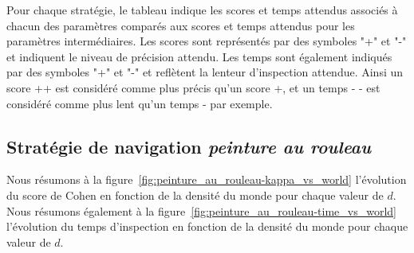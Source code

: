 \documentclass[francais,RandD]{rapportPFE}
\begin{document}
		Pour chaque stratégie, le tableau indique les scores et temps attendus associés à chacun des paramètres comparés aux scores et temps attendus pour les paramètres intermédiaires.
		Les scores sont représentés par des symboles "+" et "-" et indiquent le niveau de précision attendu.
		Les temps sont également indiqués par des symboles "+" et "-" et reflètent la lenteur d'inspection attendue.
		Ainsi un score ++ est considéré comme plus précis qu'un score +, et un temps - - est considéré comme plus lent qu'un temps - par exemple.
		\subsection*{Stratégie de navigation \textit{peinture au rouleau}}
			Nous résumons à la figure~\ref{fig:peinture_au_rouleau-kappa_vs_world} l'évolution du score de Cohen en fonction de la densité du monde pour chaque valeur de $d$.
			Nous résumons également à la figure~\ref{fig:peinture_au_rouleau-time_vs_world} l'évolution du temps d'inspection en fonction de la densité du monde pour chaque valeur de $d$.
\end{document}
